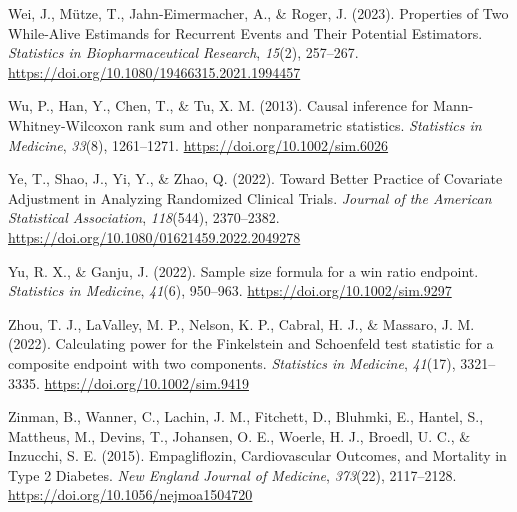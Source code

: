 \documentclass[
  letterpaper,
  DIV=11,
  numbers=noendperiod]{scrreprt}
\newlength{\cslhangindent}
\newlength{\cslentryspacingunit} %
\newenvironment{CSLReferences}[2] %
 {%
  \setlength{\parindent}{0pt}
  \ifodd #1
  \let\oldpar\par
  \def\par{\hangindent=\cslhangindent\oldpar}
  \fi
  \setlength{\parskip}{#2\cslentryspacingunit}
 }%
 {}
\begin{document}
\begin{CSLReferences}{1}{0}
\leavevmode{}%
Wei, J., Mütze, T., Jahn-Eimermacher, A., \& Roger, J. (2023).
Properties of Two While-Alive Estimands for Recurrent Events and Their
Potential Estimators. \emph{Statistics in Biopharmaceutical Research},
\emph{15}(2), 257--267.
\url{https://doi.org/10.1080/19466315.2021.1994457}

\leavevmode{}%
Wu, P., Han, Y., Chen, T., \& Tu, X. M. (2013). Causal inference for
Mann-Whitney-Wilcoxon rank sum and other nonparametric statistics.
\emph{Statistics in Medicine}, \emph{33}(8), 1261--1271.
\url{https://doi.org/10.1002/sim.6026}

\leavevmode{}%
Ye, T., Shao, J., Yi, Y., \& Zhao, Q. (2022). Toward Better Practice of
Covariate Adjustment in Analyzing Randomized Clinical Trials.
\emph{Journal of the American Statistical Association}, \emph{118}(544),
2370--2382. \url{https://doi.org/10.1080/01621459.2022.2049278}

\leavevmode{}%
Yu, R. X., \& Ganju, J. (2022). Sample size formula for a win ratio
endpoint. \emph{Statistics in Medicine}, \emph{41}(6), 950--963.
\url{https://doi.org/10.1002/sim.9297}

\leavevmode{}%
Zhou, T. J., LaValley, M. P., Nelson, K. P., Cabral, H. J., \& Massaro,
J. M. (2022). Calculating power for the Finkelstein and Schoenfeld test
statistic for a composite endpoint with two components. \emph{Statistics
in Medicine}, \emph{41}(17), 3321--3335.
\url{https://doi.org/10.1002/sim.9419}

\leavevmode{}%
Zinman, B., Wanner, C., Lachin, J. M., Fitchett, D., Bluhmki, E.,
Hantel, S., Mattheus, M., Devins, T., Johansen, O. E., Woerle, H. J.,
Broedl, U. C., \& Inzucchi, S. E. (2015). Empagliflozin, Cardiovascular
Outcomes, and Mortality in Type 2 Diabetes. \emph{New England Journal of
Medicine}, \emph{373}(22), 2117--2128.
\url{https://doi.org/10.1056/nejmoa1504720}

\end{CSLReferences}
\end{document}
